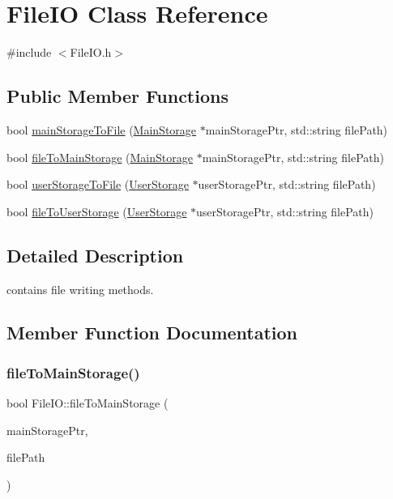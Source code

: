 \hypertarget{class_file_i_o}{}\section{File\+IO Class Reference}
\label{class_file_i_o}


{\ttfamily \#include $<$File\+I\+O.\+h$>$}

\subsection*{Public Member Functions}
\begin{DoxyCompactItemize}
\item 
bool \hyperlink{class_file_i_o_a07c62d532111ae359f3bc656acf8b27e}{main\+Storage\+To\+File} (\hyperlink{class_main_storage}{Main\+Storage} $\ast$main\+Storage\+Ptr, std\+::string file\+Path)
\item 
bool \hyperlink{class_file_i_o_a9882f280687093e3c5d1f473b8264d5b}{file\+To\+Main\+Storage} (\hyperlink{class_main_storage}{Main\+Storage} $\ast$main\+Storage\+Ptr, std\+::string file\+Path)
\item 
bool \hyperlink{class_file_i_o_af0529138b905a4fe9baea64556213d32}{user\+Storage\+To\+File} (\hyperlink{class_user_storage}{User\+Storage} $\ast$user\+Storage\+Ptr, std\+::string file\+Path)
\item 
bool \hyperlink{class_file_i_o_a8b7bed16c531fc67ff4a59c85ebfff12}{file\+To\+User\+Storage} (\hyperlink{class_user_storage}{User\+Storage} $\ast$user\+Storage\+Ptr, std\+::string file\+Path)
\end{DoxyCompactItemize}


\subsection{Detailed Description}
contains file writing methods. 

\subsection{Member Function Documentation}
\mbox{\label{class_file_i_o_a9882f280687093e3c5d1f473b8264d5b}} 
\subsubsection{\texorpdfstring{file\+To\+Main\+Storage()}{fileToMainStorage()}}
{\footnotesize\ttfamily bool File\+I\+O\+::file\+To\+Main\+Storage (\begin{DoxyParamCaption}\item[{\hyperlink{class_main_storage}{Main\+Storage} $\ast$}]{main\+Storage\+Ptr,  }\item[{std\+::string}]{file\+Path }\end{DoxyParamCaption})}

